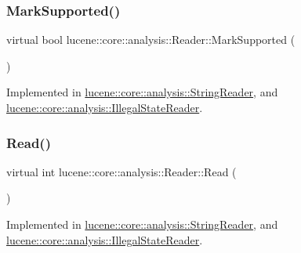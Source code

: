 \subsubsection{\texorpdfstring{Mark\+Supported()}{MarkSupported()}}
{\footnotesize\ttfamily virtual bool lucene\+::core\+::analysis\+::\+Reader\+::\+Mark\+Supported (\begin{DoxyParamCaption}{ }\end{DoxyParamCaption})\hspace{0.3cm}{\ttfamily [pure virtual]}}



Implemented in \mbox{\hyperlink{classlucene_1_1core_1_1analysis_1_1StringReader_a1b9e55036f01d10650fd4026f23da629}{lucene\+::core\+::analysis\+::\+String\+Reader}}, and \mbox{\hyperlink{classlucene_1_1core_1_1analysis_1_1IllegalStateReader_ae2de5e9375664ca55c80b224ac3cd998}{lucene\+::core\+::analysis\+::\+Illegal\+State\+Reader}}.

\mbox{\label{classlucene_1_1core_1_1analysis_1_1Reader_ae8e04911b6a4c06bb026ca6e74071cb2}} 
\subsubsection{\texorpdfstring{Read()}{Read()}\hspace{0.1cm}{\footnotesize\ttfamily [1/2]}}
{\footnotesize\ttfamily virtual int lucene\+::core\+::analysis\+::\+Reader\+::\+Read (\begin{DoxyParamCaption}{ }\end{DoxyParamCaption})\hspace{0.3cm}{\ttfamily [pure virtual]}}



Implemented in \mbox{\hyperlink{classlucene_1_1core_1_1analysis_1_1StringReader_ac9c1bb033ee4f5862e47e90c422d3381}{lucene\+::core\+::analysis\+::\+String\+Reader}}, and \mbox{\hyperlink{classlucene_1_1core_1_1analysis_1_1IllegalStateReader_a9bca98f676ac3d0eeadfd4a2cc78d764}{lucene\+::core\+::analysis\+::\+Illegal\+State\+Reader}}.

\mbox{\label{classlucene_1_1core_1_1analysis_1_1Reader_a986e25a49a947dc113a22c6de033ebe9}} 
